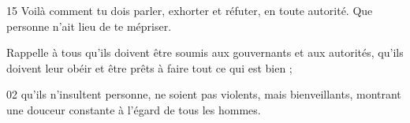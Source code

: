 15 Voilà comment tu dois parler, exhorter et réfuter, en toute autorité. Que personne n’ait lieu de te mépriser.

Rappelle à tous qu’ils doivent être soumis aux gouvernants et aux autorités, qu’ils doivent leur obéir et être prêts à faire tout ce qui est bien ;

02 qu’ils n’insultent personne, ne soient pas violents, mais bienveillants, montrant une douceur constante à l’égard de tous les hommes.
